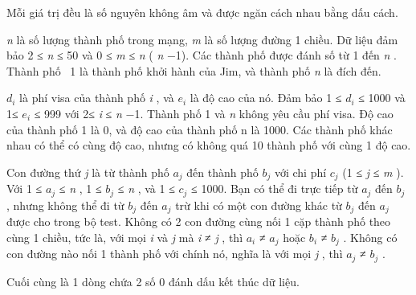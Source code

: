       Mỗi giá trị đều là số nguyên không âm và được ngăn cách nhau bằng dấu cách.     

\emph{       n      }      là số lượng thành phố trong mạng,      \emph{       m      }      là số lượng đường 1 chiều. Dữ liệu đảm bảo 2 ≤      \emph{       n      }      ≤ 50 và 0 ≤      \emph{       m      }      ≤      \emph{       n      }      (      \emph{       n      }      −1). Các thành phố được đánh số từ 1 đến      \emph{       n      }      . Thành phố  1 là thành phố khởi hành của Jim, và thành phố      \emph{       n      }      là đích đến.     

\emph{       $d_{i}$}      là phí visa của thành phố      \emph{       i      }      , và      \emph{       $e_{i}$}      là độ cao của nó. Đảm bảo 1 ≤      \emph{       $d_{i}$}      ≤ 1000 và 1≤      \emph{       $e_{i}$}      ≤ 999 với 2≤      \emph{       i      }      ≤      \emph{       n      }      −1. Thành phố 1 và      \emph{       n      }      không yêu cầu phí visa. Độ cao của thành phố 1 là 0, và độ cao của thành phố n là 1000. Các thành phố khác nhau có thể có cùng độ cao, nhưng có không quá 10 thành phố với cùng 1 độ cao.     

      Con đường thứ      \emph{       j      }      là từ thành phố      \emph{       $a_{j}$}      đến thành phố      \emph{       $b_{j}$}      với chi phí      \emph{       $c_{j}$}      (1 ≤      \emph{       j      }      ≤      \emph{       m      }      ). Với 1 ≤      \emph{       $a_{j}$}      ≤      \emph{       n      }      , 1 ≤      \emph{       $b_{j}$}      ≤      \emph{       n      }      , và 1 ≤      \emph{       $c_{j}$}      ≤ 1000. Bạn có thể đi trực tiếp từ      \emph{       $a_{j}$}      đến      \emph{       $b_{j}$}      , nhưng không thể đi từ      \emph{       $b_{j}$}      đến      \emph{       $a_{j}$}      trừ khi có một con đường khác từ      \emph{       $b_{j}$}      đến      \emph{       $a_{j}$}      được cho trong bộ test. Không có 2 con đường cùng nối 1 cặp thành phố theo cùng 1 chiều, tức là, với mọi      \emph{       i      }      và      \emph{       j      }      mà      \emph{       i      }      ≠      \emph{       j      }      , thì      \emph{       $a_{i}$}      ≠      \emph{       $a_{j}$}      hoặc      \emph{       $b_{i}$}      ≠      \emph{       $b_{j}$}      . Không có con đường nào nối 1 thành phố với chính nó, nghĩa là với mọi      \emph{       j      }      , thì      \emph{       $a_{j}$}      ≠      \emph{       $b_{j}$}      .     

      Cuối cùng là 1 dòng chứa 2 số 0 đánh dấu kết thúc dữ liệu.     

